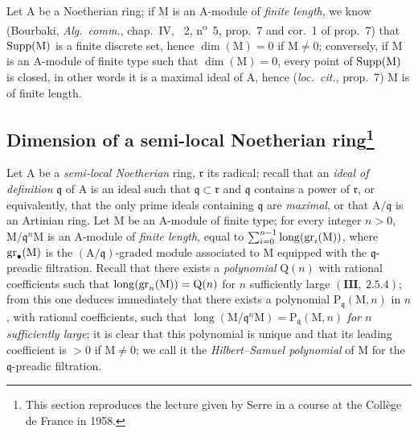 \begin{env}[16.1.10]
\label{0.16.1.10}
Let $\mathrm{A}$ be a Noetherian ring; if $\mathrm{M}$ is an $\mathrm{A}$-module of \emph{finite length}, we know (Bourbaki, \emph{Alg.~comm.}, chap.~IV, \textsection~2, n\textsuperscript{o}~5, prop.~7 and cor.~1 of prop.~7) that $\operatorname{Supp}(\mathrm{M})$ is a finite discrete set, hence $\dim(\mathrm{M})=0$ if $\mathrm{M}\neq 0$; conversely, if $\mathrm{M}$ is an $\mathrm{A}$-module of finite type such that $\dim(\mathrm{M})=0$, every point of $\operatorname{Supp}(\mathrm{M})$ is closed, in other words it is a maximal ideal of $\mathrm{A}$, hence (\emph{loc.~cit.}, prop.~7) $\mathrm{M}$ is of finite length.
\end{env}

\subsection[Dimension of a semi-local Noetherian ring]{Dimension of a semi-local Noetherian ring\protect\footnote{This section reproduces the lecture given by Serre in a course at the Collège de France in 1958.}}
\label{subsection:0.16.2}

\begin{env}[16.2.1]
\label{0.16.2.1}
Let $\mathrm{A}$ be a \emph{semi-local Noetherian} ring, $\mathfrak{r}$ its radical; recall that an \emph{ideal of definition} $\mathfrak{q}$ of $\mathrm{A}$ is an ideal such that $\mathfrak{q}\subset\mathfrak{r}$ and $\mathfrak{q}$ contains a power of $\mathfrak{r}$, or equivalently, that the only prime ideals containing $\mathfrak{q}$ are \emph{maximal}, or that $\mathrm{A}/\mathfrak{q}$ is an Artinian ring.
Let $\mathrm{M}$ be an $\mathrm{A}$-module of finite type; for every integer $n>0$, $\mathrm{M}/\mathfrak{q}^n\mathrm{M}$ is an $\mathrm{A}$-module of \emph{finite length}, equal to $\sum_{i=0}^{n-1}\operatorname{long}(\operatorname{gr}_i(\mathrm{M}))$, where $\operatorname{gr}_\bullet(\mathrm{M})$ is the $(\mathrm{A}/\mathfrak{q})$-graded module associated to $\mathrm{M}$ equipped with the $\mathfrak{q}$-preadic filtration.
Recall that there exists a \emph{polynomial} $\mathrm{Q}(n)$ with rational coefficients such that $\operatorname{long}(\operatorname{gr}_n(\mathrm{M}))=\mathrm{Q}(n)$ for $n$ sufficiently large $(\mathbf{III},~2.5.4)$; from this one deduces immediately that there exists a polynomial $\mathrm{P}_\mathfrak{q}(\mathrm{M},n)$ in $n$, with rational coefficients, such that $\operatorname{long}(\mathrm{M}/\mathfrak{q}^n\mathrm{M})=\mathrm{P}_\mathfrak{q}(\mathrm{M},n)$ \emph{for $n$ sufficiently large}; it is clear that this polynomial is unique and that its leading coefficient is $>0$ if $\mathrm{M}\neq 0$; we call it the \emph{Hilbert--Samuel polynomial} of $\mathrm{M}$ for the $\mathfrak{q}$-preadic filtration.
\end{env}

